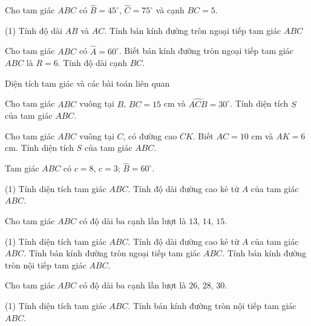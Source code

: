 \begin{vd}%
	Cho tam giác $ABC$ có $\widehat{B}=45^ \circ$, $\widehat{C}=75^ \circ$ và cạnh $BC=5$. 
	\begin{tasks}(1)
		\task Tính độ dài $AB$ và $AC$.
		\task Tính bán kính đường tròn ngoại tiếp tam giác $ABC$
	\end{tasks}
\end{vd}

\begin{vd}
	Cho tam giác $ABC$ có $\widehat{A}=60^\circ$. Biết bán kính đường tròn ngoại tiếp tam giác $ABC$ là $R=6$. Tính độ dài cạnh $BC$.
\end{vd}
\begin{dang}{Diện tích tam giác và các bài toán liên quan}	
\end{dang}

\begin{vd}
	Cho tam giác $ABC$ vuông tại $B$, $BC=15$ cm và $\widehat{ACB}=30^\circ$. Tính diện tích $S$ của tam giác $ABC$.
\end{vd}

\begin{vd}
	Cho tam giác $ABC$ vuông tại $C$, có đường cao $CK$. Biết $AC=10$ cm và $AK=6$ cm. Tính diện tích $S$ của tam giác $ABC$.
\end{vd}

\begin{vd}
	Tam giác $ABC$ có $c= 8$, $c= 3$; $\widehat{B}=60^\circ$.
	\begin{tasks}(1)
		\task Tính diện tích tam giác $ABC$.
		\task Tính độ dài đường cao kẻ từ $A$ của tam giác $ABC$.
	\end{tasks}
	
\end{vd}

\begin{vd}
	Cho tam giác $ABC$ có độ dài ba cạnh lần lượt là $13$, $14$, $15$.
	\begin{tasks}(1)
		\task Tính diện tích tam giác $ABC$.
		\task Tính độ dài đường cao kẻ từ $A$ của tam giác $ABC$.
		\task Tính bán kính đường tròn ngoại tiếp tam giác $ABC$.
		\task Tính bán kính đường tròn nội tiếp tam giác $ABC$.
	\end{tasks}
	
\end{vd}

\begin{vd}
	Cho tam giác $ABC$ có độ dài ba cạnh lần lượt là $26$, $28$, $30$.
	\begin{tasks}(1)
		\task Tính diện tích tam giác $ABC$.
		\task Tính bán kính đường tròn nội tiếp tam giác $ABC$.
	\end{tasks}
	
\end{vd}

